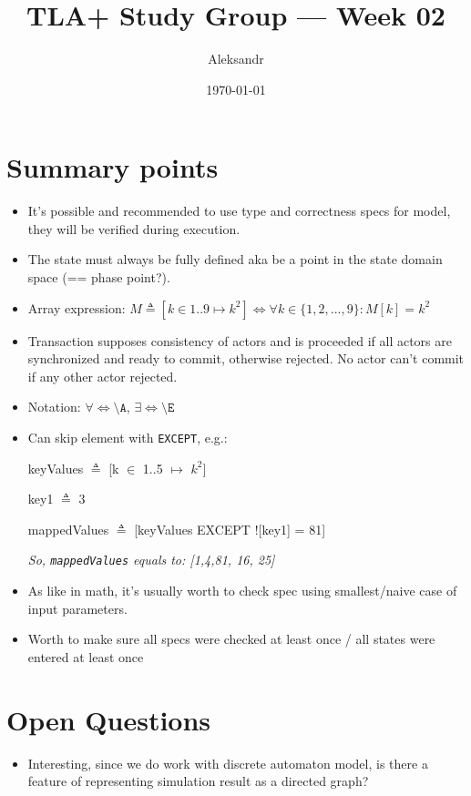 \documentclass[11pt]{article}
\title{TLA+ Study Group — Week 02}
\author{Aleksandr}
\date{\today}
\begin{document}
\maketitle

\section*{Summary points}
\begin{itemize}
\item It's possible and recommended to use type and correctness specs for model, they will be verified during execution.
\item The state must always be fully defined aka be a point in the state domain space (== phase point?).

\item Array expression: $M \triangleq [k \in 1..9 \mapsto	k^2] \iff	\forall k \in \{1,2,...,9\}: M[k] =k^2$

\item Transaction supposes consistency of actors and is proceeded if all actors are synchronized and ready to commit, otherwise rejected. No actor can't commit if any other actor rejected.

\item Notation: $\forall \iff \texttt{\textbackslash A}$, $\exists \iff \texttt{\textbackslash E}$

\item Can skip element with \texttt{EXCEPT}, e.g.:


keyValues $\triangleq$ [k $\in$ 1..5 $\mapsto$ $k^2$]

key1  $\triangleq$ 3

mappedValues $\triangleq$ [keyValues EXCEPT ![key1] = 81] 

\textit{So, \texttt{mappedValues} equals to: [1,4,81, 16, 25]}


\item As like in math, it's usually worth to check spec using smallest/naive case of input parameters.

\item Worth to make sure all specs were checked at least once / all states were entered at least once
\end{itemize}

\section*{Open Questions}
\begin{itemize}

\item Interesting, since we do work with discrete automaton model, is there a feature of representing simulation result as a directed graph?

\end{itemize}
\end{document}
